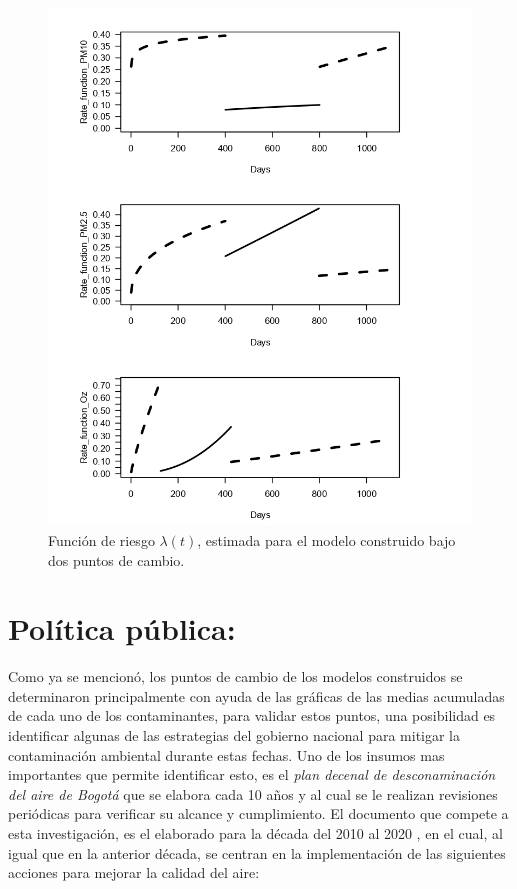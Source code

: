 \begin{figure}[hbt!]
\begin{center}
\includegraphics[width=13cm]{RATEDPC}
\end{center}
\centering
\caption{ Función de riesgo $\lambda (t)$, estimada para el modelo construido bajo dos puntos de cambio.   }
\label{rate_dpc}
\end{figure}



\newpage

\section{Política pública:}

Como ya se mencionó, los puntos de cambio de los modelos construidos se determinaron principalmente con ayuda de las gráficas de las medias acumuladas de cada uno de los contaminantes, para validar estos puntos, una posibilidad es identificar algunas de las estrategias del gobierno nacional para mitigar la contaminación ambiental durante estas fechas.
Uno de los insumos mas importantes que permite identificar esto, es el \textit{plan decenal de desconaminación del aire de Bogotá} que se elabora cada 10 años y al cual se le realizan revisiones periódicas para verificar su alcance y cumplimiento. 
El documento que compete a esta investigación, es el elaborado para la década del 2010 al 2020 \cite{plandecenal}, en el cual, al igual que en la anterior década, se centran en la implementación de las siguientes acciones para mejorar la calidad del aire: 


